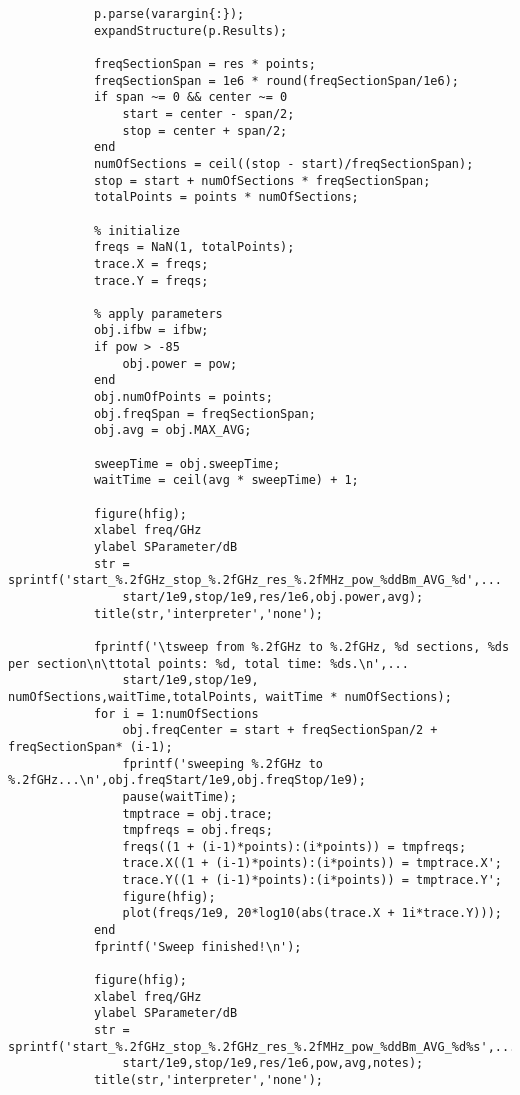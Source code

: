 \begin{lstlisting}
            p.parse(varargin{:});
            expandStructure(p.Results);
            
            freqSectionSpan = res * points;
            freqSectionSpan = 1e6 * round(freqSectionSpan/1e6);
            if span ~= 0 && center ~= 0
                start = center - span/2;
                stop = center + span/2;
            end
            numOfSections = ceil((stop - start)/freqSectionSpan);
            stop = start + numOfSections * freqSectionSpan;
            totalPoints = points * numOfSections;
            
            % initialize
            freqs = NaN(1, totalPoints);
            trace.X = freqs;
            trace.Y = freqs;
            
            % apply parameters
            obj.ifbw = ifbw;
            if pow > -85
                obj.power = pow;
            end
            obj.numOfPoints = points;
            obj.freqSpan = freqSectionSpan;
            obj.avg = obj.MAX_AVG;
            
            sweepTime = obj.sweepTime;
            waitTime = ceil(avg * sweepTime) + 1;
            
            figure(hfig);
            xlabel freq/GHz
            ylabel SParameter/dB
            str = sprintf('start_%.2fGHz_stop_%.2fGHz_res_%.2fMHz_pow_%ddBm_AVG_%d',...
                start/1e9,stop/1e9,res/1e6,obj.power,avg);
            title(str,'interpreter','none');
            
            fprintf('\tsweep from %.2fGHz to %.2fGHz, %d sections, %ds per section\n\ttotal points: %d, total time: %ds.\n',...
                start/1e9,stop/1e9, numOfSections,waitTime,totalPoints, waitTime * numOfSections);
            for i = 1:numOfSections
                obj.freqCenter = start + freqSectionSpan/2 +  freqSectionSpan* (i-1);
                fprintf('sweeping %.2fGHz to %.2fGHz...\n',obj.freqStart/1e9,obj.freqStop/1e9);
                pause(waitTime);
                tmptrace = obj.trace;
                tmpfreqs = obj.freqs;
                freqs((1 + (i-1)*points):(i*points)) = tmpfreqs;
                trace.X((1 + (i-1)*points):(i*points)) = tmptrace.X';
                trace.Y((1 + (i-1)*points):(i*points)) = tmptrace.Y';
                figure(hfig);
                plot(freqs/1e9, 20*log10(abs(trace.X + 1i*trace.Y)));
            end
            fprintf('Sweep finished!\n');
            
            figure(hfig);
            xlabel freq/GHz
            ylabel SParameter/dB
            str = sprintf('start_%.2fGHz_stop_%.2fGHz_res_%.2fMHz_pow_%ddBm_AVG_%d%s',...
                start/1e9,stop/1e9,res/1e6,pow,avg,notes);
            title(str,'interpreter','none');
            

\end{lstlisting}
